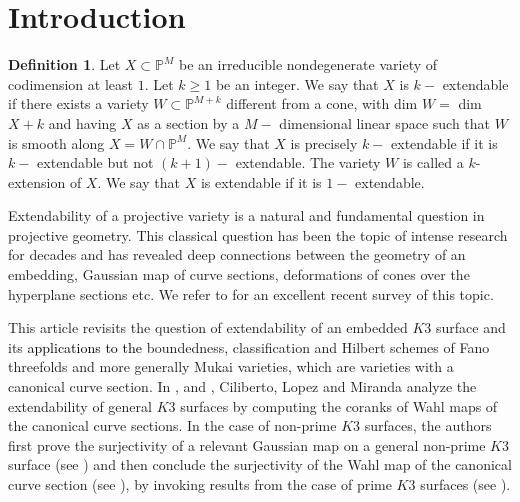 \documentclass[11pt,twoside]{amsart}
\theoremstyle{plain}
\numberwithin{equation}{section}
\theoremstyle{definition}
\newtheorem{definition}[theorem]{Definition}
\begin{document}
    

\section{Introduction}

\begin{definition}\label{extendability}
Let $X \subset \mathbb{P}^M$ be an irreducible nondegenerate variety of codimension at least $1$. Let $k \geq 1$ be an integer. We say that $X$ is $k-$ extendable if there exists a variety $W \subset \mathbb{P}^{M+k}$
different from a cone, with dim $W =$ dim $X + k$ and having $X$ as a section by a $M-$ dimensional linear space such that $W$ is smooth along $X = W \cap \mathbb{P}^M$. We say that $X$ is precisely $k-$ extendable if it is $k-$ extendable but not $(k + 1)-$ extendable. The variety $W$ is called a $k$-extension of $X$. We say that $X$ is extendable if it is $1-$ extendable.  
\end{definition}

Extendability of a projective variety is a natural and fundamental question in projective geometry. This classical question has been the topic of intense research for decades and has revealed deep connections between the geometry of an embedding, Gaussian map of curve sections, deformations of cones over the hyperplane sections etc. We refer to \cite{Lop23} for an excellent recent survey of this topic. 

\smallskip

This article revisits the question of extendability of an embedded $K3$ surface and its \textcolor{black}{applications}  \textcolor{black}{to the} boundedness, classification and Hilbert schemes of Fano threefolds and more generally Mukai varieties, which are varieties with a canonical curve section. In \cite{CLM93}, \cite{CLM94} and \cite{CLM98},  Ciliberto, Lopez and Miranda analyze the extendability of general $K3$ surfaces by computing the coranks of Wahl maps of the canonical curve sections. In the case of non-prime $K3$ surfaces, the authors first prove the surjectivity of a relevant Gaussian map on a general non-prime $K3$ surface (see \cite{CLM94}) and then conclude the surjectivity of the Wahl map of the canonical curve section (see \cite{CLM98}), by invoking results from the case of prime $K3$ surfaces (see \cite[Lemma $2.3$]{CLM98} \cite[Lemma $4$]{CLM93}).
\end{document}
